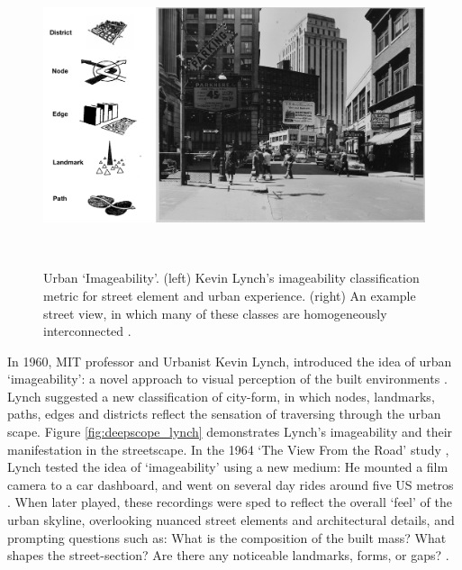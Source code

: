 {{{            \begin{figure}[!htb]
                \centering
                \includegraphics[width=1\columnwidth]{chapters/prediction/deepscope/figures/deepscope5.png}
                \caption{Urban `Imageability'. (left) Kevin Lynch's imageability classification metric for street element and urban experience. (right) An example street view, in which many of these classes are homogeneously interconnected \cite{lynch1960image}.}~\label{fig:deepscope_lynch}
            \end{figure}

            In 1960, MIT professor and Urbanist Kevin Lynch, introduced the idea of urban `imageability': a novel approach to visual perception of the built environments \cite{lynch1960image}. Lynch suggested a new classification of city-form, in which nodes, landmarks, paths, edges and districts reflect the sensation of traversing through the urban scape. Figure \eqref{fig:deepscope_lynch} demonstrates Lynch's imageability  and their manifestation in the streetscape. In the 1964 `The View From the Road' study \cite{appleyard1964view}, Lynch tested the idea of `imageability' using a new medium: He mounted a film camera to a car dashboard, and went on several day rides around five US metros \cite{Andrews2007}. When later played, these recordings were sped to reflect the overall `feel' of the urban skyline, overlooking nuanced street elements and architectural details, and prompting questions such as: What is the composition of the built mass? What shapes the street-section? Are there any noticeable landmarks, forms, or gaps? \cite{carr1969city, pearce1996legacy}.
        }

}}

